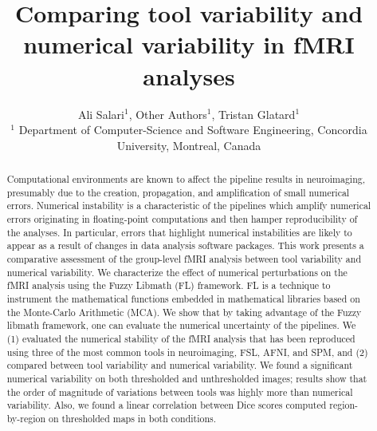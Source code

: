 \documentclass[conference]{IEEEtran}
\begin{document}
\newcommand{\fslspm}{FSL-SPM\xspace}
\newcommand{\fslafni}{FSL-AFNI\xspace}
\newcommand{\afnispm}{AFNI-SPM\xspace}


\title{Comparing tool variability and numerical variability in fMRI analyses}

\author{Ali Salari$^1$, Other Authors$^1$, Tristan Glatard$^1$ \\ 
$^1$ Department of Computer-Science and Software Engineering, Concordia University, Montreal, Canada}

\maketitle
\begin{abstract}

Computational environments are known to affect the pipeline results in neuroimaging,
presumably due to the creation, propagation, and amplification of small numerical errors.
Numerical instability is a characteristic of the pipelines which amplify numerical errors
originating in floating-point computations and then hamper reproducibility of the analyses.
In particular, errors that highlight numerical instabilities are likely to appear as a result of changes in data analysis software packages.
This work presents a comparative assessment of the group-level fMRI analysis between tool variability and numerical variability.   
We characterize the effect of numerical perturbations on the fMRI analysis using the Fuzzy Libmath (FL) framework.
FL is a technique to instrument the mathematical functions embedded in mathematical libraries based on the Monte-Carlo Arithmetic (MCA).
We show that by taking advantage of the Fuzzy libmath framework, one can evaluate the numerical uncertainty of the pipelines. 
We (1) evaluated the numerical stability of the fMRI analysis that has been reproduced using three of the most common tools in neuroimaging, FSL, AFNI, and SPM,
and (2) compared between tool variability and numerical variability.
We found a significant numerical variability on both thresholded and unthresholded images;
results show that the order of magnitude of variations between tools was highly more than numerical variability.
Also, we found a linear correlation between Dice scores computed region-by-region on thresholded maps in both conditions.


\end{abstract}
\end{document}

